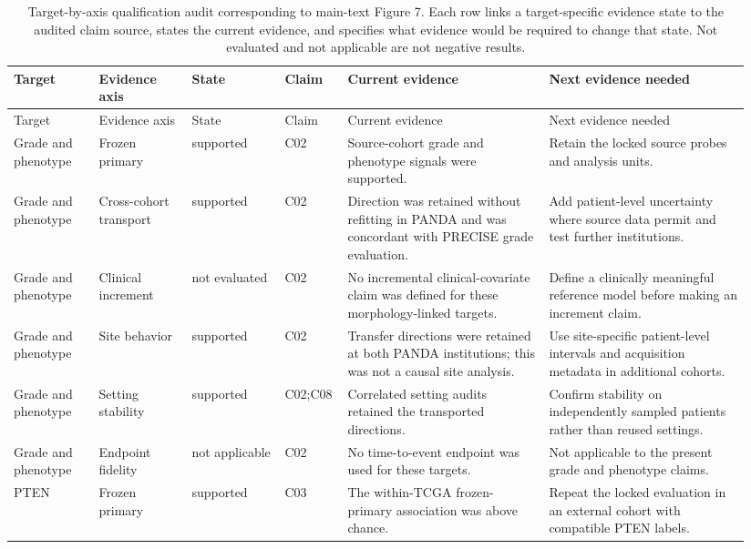 \begingroup
\fontsize{9.5pt}{11pt}\selectfont
\setlength{\tabcolsep}{3pt}
\begin{longtable}{@{}p{0.11\linewidth}p{0.12\linewidth}p{0.12\linewidth}p{0.07\linewidth}p{0.26\linewidth}p{0.26\linewidth}@{}}
\caption{Target-by-axis qualification audit corresponding to main-text Figure 7. Each row links a target-specific evidence state to the audited claim source, states the current evidence, and specifies what evidence would be required to change that state. Not evaluated and not applicable are not negative results.}
\label{tab:supp-evidence-axis-audit}\\
\toprule
Target & Evidence axis & State & Claim & Current evidence & Next evidence needed \\
\midrule
\endfirsthead
\toprule
Target & Evidence axis & State & Claim & Current evidence & Next evidence needed \\
\midrule
\endhead
Grade and phenotype & Frozen primary & supported & C02 & Source-cohort grade and phenotype signals were supported. & Retain the locked source probes and analysis units. \\
Grade and phenotype & Cross-cohort transport & supported & C02 & Direction was retained without refitting in PANDA and was concordant with PRECISE grade evaluation. & Add patient-level uncertainty where source data permit and test further institutions. \\
Grade and phenotype & Clinical increment & not evaluated & C02 & No incremental clinical-covariate claim was defined for these morphology-linked targets. & Define a clinically meaningful reference model before making an increment claim. \\
Grade and phenotype & Site behavior & supported & C02 & Transfer directions were retained at both PANDA institutions; this was not a causal site analysis. & Use site-specific patient-level intervals and acquisition metadata in additional cohorts. \\
Grade and phenotype & Setting stability & supported & C02;C08 & Correlated setting audits retained the transported directions. & Confirm stability on independently sampled patients rather than reused settings. \\
Grade and phenotype & Endpoint fidelity & not applicable & C02 & No time-to-event endpoint was used for these targets. & Not applicable to the present grade and phenotype claims. \\
PTEN & Frozen primary & supported & C03 & The within-TCGA frozen-primary association was above chance. & Repeat the locked evaluation in an external cohort with compatible PTEN labels. \\

\end{longtable}
